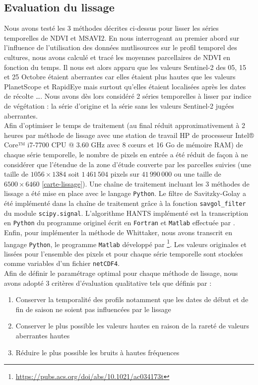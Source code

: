 \subsection{Evaluation du lissage}

Nous avons testé les 3 méthodes décrites ci-dessus pour lisser les séries temporelles de NDVI et MSAVI$2$. En nous interrogeant au premier abord sur l'influence de l'utilisation des données mutlisources sur le profil temporel des cultures, nous avons calculé et tracé les moyennes parcellaires de NDVI en fonction du temps. Il nous est alors apparu que les valeurs Sentinel-2 des 05, 15 et 25 Octobre étaient aberrantes car elles étaient plus hautes que les valeurs PlanetScope et RapidEye mais surtout qu'elles étaient localisées après les dates de récolte \ldots{}. Nous avons dès lors considéré 2 séries temporelles à lisser par indice de végétation : la série d'origine et la série sans les valeurs Sentinel-2 jugées aberrantes. 
\\Afin d'optimiser le temps de traitement (au final réduit approximativement à 2 heures par méthode de lissage avec une station de travail HP de processeur Intel® Core™ i7-7700 CPU @ 3.60 GHz avec 8 c\oe urs et 16 Go de mémoire RAM)  de chaque série temporelle, le nombre de pixels en entrée a été réduit de façon à ne considérer que l'étendue de la zone d'étude couverte par les parcelles suivies (une taille de $1056\times1384$ soit $1\,461\,504$ pixels sur $41\,990\,000$ ou une taille de $6500\times6460$ \cref{carte-lissage}). Une chaîne de traitement incluant les 3 méthodes de lissage a été mise en place avec le langage \texttt{Python}. Le filtre de Savitzky-Golay a été implémenté dans la chaîne de traitement grâce à la fonction \texttt{savgol\_filter} du module \texttt{scipy.signal}. L'algorithme HANTS implémenté est la transcription en \texttt{Python} du programme originel écrit en \texttt{Fortran} et \texttt{Matlab} effectuée par \citet{Espinoza-Davalos2017}. Enfin, pour implémenter la méthode de Whittaker, nous avons transcrit en langage \texttt{Python}, le programme \texttt{Matlab} développé par \citet{Eilers2003} \footnote{\url{https://pubs.acs.org/doi/abs/10.1021/ac034173t}}. Les valeurs originales et lissées pour l'ensemble des pixels et pour chaque série temporelle sont stockées comme variables d'un fichier \texttt{netCDF4}. 
\\Afin de définir le paramétrage optimal pour chaque méthode de lissage, nous avons adopté 3 critères d'évaluation qualitative tels que définis par \citet{Klisch2006} : 
\begin{enumerate}
 \item Conserver la temporalité des profils notamment que les dates de début et de fin de saison ne soient pas influencées par le lissage
 \item Conserver le plus possible les valeurs hautes en raison de la rareté de valeurs aberrantes hautes
 \item Réduire le plus possible les bruits à hautes fréquences
\end{enumerate}
